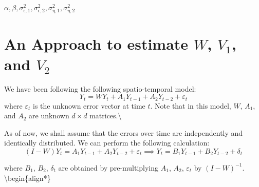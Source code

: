\documentclass[
  12pt,
]{article}
\begin{document}
\(\alpha, \beta, \sigma^2_{\epsilon,1}, \sigma^2_{\epsilon,2}, \sigma^2_{\eta,1}, \sigma^2_{\eta,2}\)

\section{\textbf{\textcolor{DeepBlue}{An Approach to estimate $W$, $V_1$, and $V_2$}}}

We have been following the following spatio-temporal model:
\[Y_t = W Y_t + A_1 Y_{t-1} + A_2 Y_{t-2} + \varepsilon_t\] where
\(\varepsilon_t\) is the unknown error vector at time \(t\). Note that
in this model, \(W\), \(A_1\), and \(A_2\) are unknown \(d \times d\)
matrices.\textbackslash{}

As of now, we shall assume that the errors over time are independently
and identically distributed. We can perform the following calculation:
\[(I - W) Y_t =  A_1 Y_{t-1} + A_2 Y_{t-2} + \varepsilon_t \implies Y_t =  B_1 Y_{t-1} + B_2 Y_{t-2} + \delta_t\]

where \(B_1\), \(B_2\), \(\delta_t\) are obtained by pre-multiplying
\(A_1\), \(A_2\), \(\varepsilon_t\) by \((I - W)^{-1}\).
\textbackslash begin\{align*\}
\end{document}
